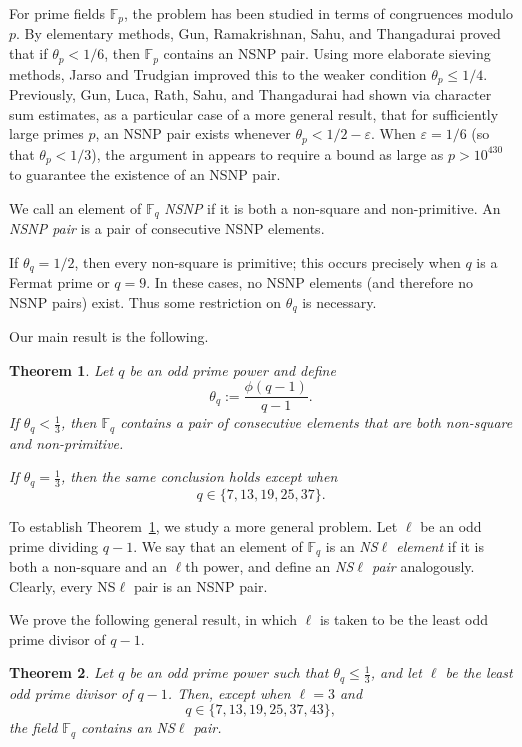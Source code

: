 \documentclass[12pt]{amsart}
\newtheorem{thm}{Theorem}[section]
\numberwithin{equation}{section}
\newcommand{\F}{\mathbb{F}_q}
\newcommand{\Fp}{\mathbb{F}_p}
\begin{document}
For prime fields $\Fp$, the problem has been studied in terms of congruences modulo $p$. By elementary methods, Gun, Ramakrishnan, Sahu, and Thangadurai \cite{GRST2005} proved that if $\theta_p < 1/6$, then $\Fp$ contains an  NSNP pair. Using more elaborate sieving methods, Jarso and Trudgian \cite{JT2019} improved this to the weaker condition $\theta_p \le 1/4$. Previously, Gun, Luca, Rath, Sahu, and Thangadurai \cite{GLRST2007} had shown via character sum estimates, as a particular case of a more general result, that for sufficiently large primes $p$, an  NSNP pair exists whenever $\theta_p < 1/2 - \varepsilon$. When $\varepsilon = 1/6$ (so that $\theta_p < 1/3$), the argument in \cite{GLRST2007} appears to require a bound as large as $p > 10^{430}$ to guarantee the existence of an  NSNP pair.

\medskip

We call an element of $\F$ \emph{NSNP} if it is both a non-square and non-primitive. An \emph{NSNP pair} is a pair of consecutive NSNP elements.

If $\theta_q=1/2$, then every non-square is primitive; this occurs precisely when $q$ is a Fermat prime or $q=9$. In these cases, no NSNP elements (and therefore no NSNP pairs) exist. Thus some restriction on $\theta_q$ is necessary.

\bigskip
Our main result is the following.

\begin{thm}\label{main}
Let $q$ be an odd prime power and define
\[
\theta_q := \frac{\phi(q-1)}{q-1}.
\]
If $\theta_q < \tfrac{1}{3}$, then $\F$ contains a pair of consecutive elements that are both non-square and non-primitive.

If $\theta_q = \tfrac{1}{3}$, then the same conclusion holds except when
\[
q \in \{7,13,19,25,37\}.
\]
\end{thm}

\medskip
To establish Theorem~\ref{main}, we study a more general problem. Let $\ell$ be an odd prime dividing $q-1$. We say that an element of $\F$ is an \emph{NS$\ell$ element} if it is both a non-square and an $\ell$th power, and define an \emph{NS$\ell$ pair} analogously. Clearly, every NS$\ell$ pair is an NSNP pair.

We prove the following general result, in which $\ell$ is taken to be the least odd prime divisor of $q-1$.

\begin{thm}\label{lpower}
Let $q$ be an odd prime power such that $\theta_q \le \tfrac{1}{3}$, and let $\ell$ be the least odd prime divisor of $q-1$. Then, except when $\ell = 3$ and
\[
q \in \{7,13,19,25,37,43\},
\]
the field $\F$ contains an NS$\ell$ pair.
\end{thm}
\end{document}
